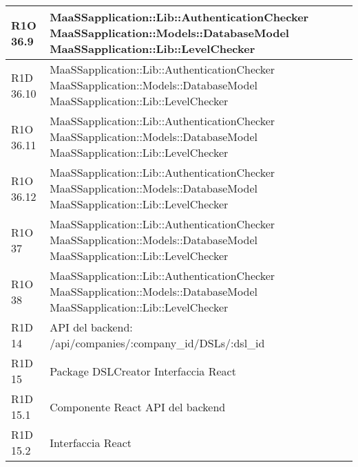 \begin{center}
\begin{longtable}{ | l | p{8cm} |}
   	R1O 36.9 & MaaSSapplication::Lib::AuthenticationChecker \newline  MaaSSapplication::Models::DatabaseModel \newline MaaSSapplication::Lib::LevelChecker \\ \hline
   	
   	R1D 36.10 & MaaSSapplication::Lib::AuthenticationChecker \newline  MaaSSapplication::Models::DatabaseModel \newline MaaSSapplication::Lib::LevelChecker \\ \hline
   	
   	R1O 36.11 & MaaSSapplication::Lib::AuthenticationChecker \newline  MaaSSapplication::Models::DatabaseModel \newline MaaSSapplication::Lib::LevelChecker \\ \hline
   	
   	R1O 36.12 & MaaSSapplication::Lib::AuthenticationChecker \newline  MaaSSapplication::Models::DatabaseModel \newline MaaSSapplication::Lib::LevelChecker \\ \hline
   	
   	R1O 37 & MaaSSapplication::Lib::AuthenticationChecker \newline  MaaSSapplication::Models::DatabaseModel \newline MaaSSapplication::Lib::LevelChecker \\ \hline
   	
   	R1O 38 & MaaSSapplication::Lib::AuthenticationChecker \newline  MaaSSapplication::Models::DatabaseModel \newline MaaSSapplication::Lib::LevelChecker \\ \hline

	R1D 14 & API del backend: /api/companies/:company_id/DSLs/:dsl_id \\ \hline
	
	R1D 15 & Package DSLCreator \newline Interfaccia React \\ \hline

	R1D 15.1 & Componente React \newline API del backend \\ \hline

	R1D 15.2 & Interfaccia React \\ \hline


\end{longtable}
\end{center}
